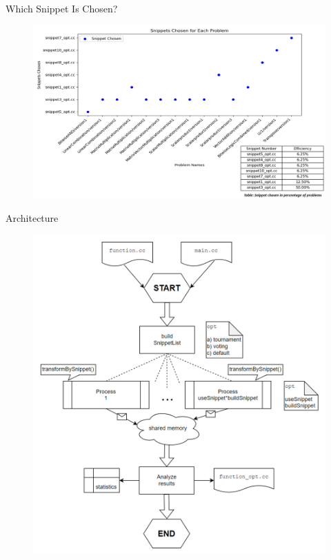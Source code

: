 \documentclass{beamer}
\begin{document}
\begin{frame}{Which Snippet Is Chosen?}
    \begin{figure}
        \centering
        \includegraphics[height=0.8\textheight]{images/snippet-metric.png}
    \end{figure}  
\end{frame}

\begin{frame}{Architecture}
    \vspace{-1.2cm}
    \begin{figure}
        \centering
        \hspace*{1cm} 
        \includegraphics[height=\textheight]{images/architecture.png} 
    \end{figure}
\end{frame}
\end{document}
